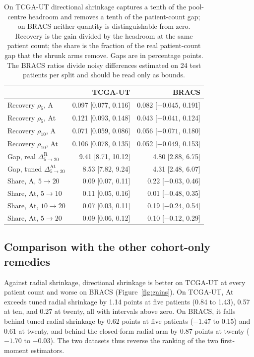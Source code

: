 \begin{table}[htbp]
\centering
\small
\renewcommand{\arraystretch}{1.15}
\begin{tabular}{@{}lrr@{}}
\toprule
 & TCGA-UT & BRACS \\
\midrule
Recovery $\rho_5$, A & 0.097 [0.077, 0.116] & 0.082 [$-0.045$, 0.191] \\
Recovery $\rho_5$, At & 0.121 [0.093, 0.148] & 0.043 [$-0.041$, 0.124] \\
Recovery $\rho_{10}$, A & 0.071 [0.059, 0.086] & 0.056 [$-0.071$, 0.180] \\
Recovery $\rho_{10}$, At & 0.106 [0.078, 0.135] & 0.052 [$-0.049$, 0.153] \\
\addlinespace
Gap, real $\Delta^{\mathrm R}_{5\to20}$ & 9.41 [8.71, 10.12] & 4.80 [2.88, 6.75] \\
Gap, tuned $\Delta^{\mathrm{At}}_{5\to20}$ & 8.53 [7.82, 9.24] & 4.31 [2.48, 6.07] \\
Share, A, $5\to20$ & 0.09 [0.07, 0.11] & 0.22 [$-0.03$, 0.46] \\
Share, At, $5\to10$ & 0.11 [0.05, 0.16] & 0.01 [$-0.48$, 0.35] \\
Share, At, $10\to20$ & 0.07 [0.03, 0.11] & 0.19 [$-0.24$, 0.54] \\
Share, At, $5\to20$ & 0.09 [0.06, 0.12] & 0.10 [$-0.12$, 0.29] \\
\bottomrule
\end{tabular}
\caption{On TCGA-UT directional shrinkage captures a tenth of the pool-centre headroom and removes a tenth of the patient-count gap; on BRACS neither quantity is distinguishable from zero. Recovery is the gain divided by the headroom at the same patient count; the share is the fraction of the real patient-count gap that the shrunk arms remove. Gaps are in percentage points. The BRACS ratios divide noisy differences estimated on 24 test patients per split and should be read only as bounds.}
\label{tab:shares}
\end{table}

\subsection{Comparison with the other cohort-only remedies}
\label{sec:comparison-results}
Against radial shrinkage, directional shrinkage is better on TCGA-UT at every patient count and worse on BRACS (Figure~\ref{fig:gains}). On TCGA-UT, At exceeds tuned radial shrinkage by 1.14 points at five patients (0.84 to 1.43), 0.57 at ten, and 0.27 at twenty, all with intervals above zero. On BRACS, it falls behind tuned radial shrinkage by 0.62 points at five patients ($-1.47$ to 0.15) and 0.61 at twenty, and behind the closed-form radial arm by 0.87 points at twenty ($-1.70$ to $-0.03$). The two datasets thus reverse the ranking of the two first-moment estimators.

